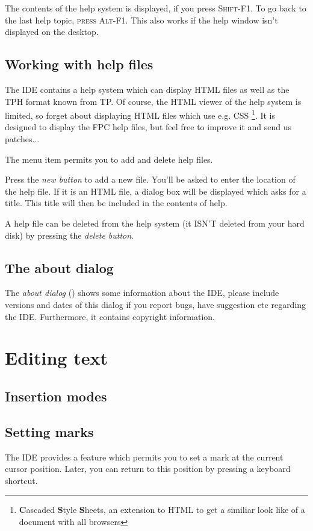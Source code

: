 The contents of the help system is displayed, if you press \textsc{Shift-F1}.
To go back to the last help topic, \textsc{press Alt-F1}. This also works
if the help window isn't displayed on the desktop.

\subsection{Working with help files}
The IDE contains a help system which can display HTML files
as well as the TPH format known from TP. Of course, the HTML
viewer of the help system is limited, so forget about displaying
HTML files which use e.g. CSS \footnote{\textbf{C}ascaded
\textbf{S}tyle \textbf{S}heets, an extension to HTML to
get a similiar look like of a document with all browsers}. It is designed to display the FPC
help files, but feel free to improve it and send us patches...

The menu item  permits you to add and delete
help files.

Press the \emph{new button} to add a new file. You'll be asked to enter
the location of the help file. If it is an
HTML file, a dialog box will be displayed
which asks for a title. This title will then be included in the
contents of help.

A help file can be deleted from the help system (it ISN'T deleted from
your hard disk) by pressing the \emph{delete button}.

\subsection{The about dialog}
The \emph{about dialog} () shows some information
about the IDE, please include versions and dates of this
dialog if you report bugs, have suggestion etc regarding the IDE.
Furthermore, it contains copyright information.

\section{Editing text}
\label{ide:editingtext}

\subsection{Insertion modes}

\subsection{Setting marks}
The IDE provides a feature which permits you to set a mark at
the current cursor position. Later, you can return to this
position by pressing a keyboard shortcut.

